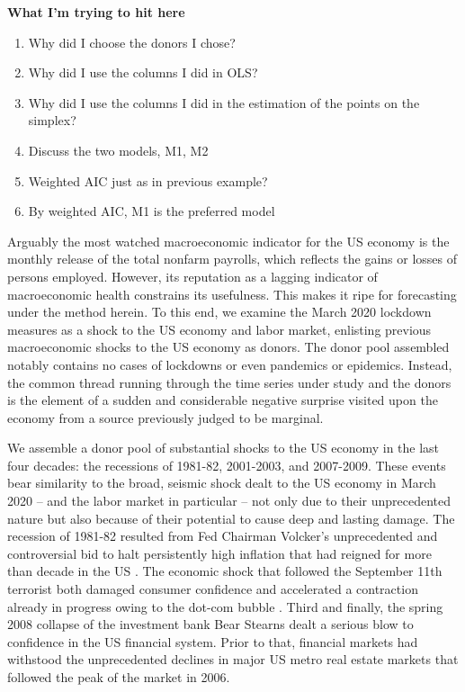 \documentclass[11pt]{article}
\theoremstyle{definition}
\begin{document}
\textbf{What I'm trying to hit here}
\begin{enumerate}
\item Why did I choose the donors I chose? 
\item Why did I use the columns I did in OLS? 
\item Why did I use the columns I did in the estimation of the points on the simplex? 
\item Discuss the two models, M1, M2 
\item Weighted AIC just as in previous example?  
\item By weighted AIC, M1 is the preferred model 
\end{enumerate}

Arguably the most watched macroeconomic indicator for the US economy is the monthly release of the total nonfarm payrolls, which reflects the gains or losses of persons employed.  However, its reputation as a lagging indicator of macroeconomic health constrains its usefulness.  This makes it ripe for forecasting under the method herein.  To this end, we examine the March 2020 lockdown measures as a shock to the US economy and labor market, enlisting previous macroeconomic shocks to the US economy as donors.  The donor pool assembled notably contains no cases of lockdowns or even pandemics or epidemics.  Instead, the common thread running through the time series under study and the donors is the element of a sudden and considerable negative surprise visited upon the economy from a source previously judged to be marginal.  

We assemble a donor pool of substantial shocks to the US economy in the last four decades: the recessions of 1981-82, 2001-2003, and 2007-2009. These events bear similarity to the broad, seismic shock dealt to the US economy in March 2020 -- and the labor market in particular --  not only due to their unprecedented nature but also because of their potential to cause deep and lasting damage.  The recession of 1981-82 resulted from Fed Chairman Volcker's unprecedented and controversial bid to halt persistently high inflation that had reigned for more than decade in the US \citep{sablik_2013}.  The economic shock that followed the September 11th terrorist both damaged consumer confidence and accelerated a contraction already in progress owing to the dot-com bubble \citep{kliesen_2003}.  Third and finally, the spring 2008 collapse of the investment bank Bear Stearns dealt a serious blow to confidence in the US financial system.  Prior to that, financial markets had withstood the unprecedented declines in major US metro real estate markets that followed the peak of the market in 2006.
\end{document}
